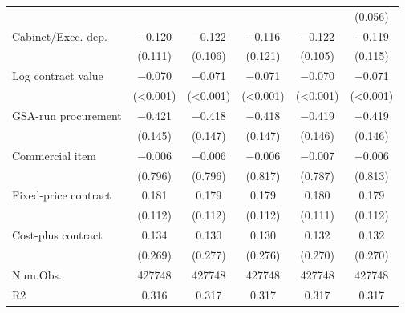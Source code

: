 \begin{tabular}[t]{lccccc}
 &  &  &  &  & (\num{0.056})\\
Cabinet/Exec. dep. & \num{-0.120} & \num{-0.122} & \num{-0.116} & \num{-0.122} & \num{-0.119}\\
 & (\num{0.111}) & (\num{0.106}) & (\num{0.121}) & (\num{0.105}) & (\num{0.115})\\
Log contract value & \num{-0.070} & \num{-0.071} & \num{-0.071} & \num{-0.070} & \num{-0.071}\\
 & (\num{<0.001}) & (\num{<0.001}) & (\num{<0.001}) & (\num{<0.001}) & (\num{<0.001})\\
GSA-run procurement & \num{-0.421} & \num{-0.418} & \num{-0.418} & \num{-0.419} & \num{-0.419}\\
 & (\num{0.145}) & (\num{0.147}) & (\num{0.147}) & (\num{0.146}) & (\num{0.146})\\
Commercial item & \num{-0.006} & \num{-0.006} & \num{-0.006} & \num{-0.007} & \num{-0.006}\\
 & (\num{0.796}) & (\num{0.796}) & (\num{0.817}) & (\num{0.787}) & (\num{0.813})\\
Fixed-price contract & \num{0.181} & \num{0.179} & \num{0.179} & \num{0.180} & \num{0.179}\\
 & (\num{0.112}) & (\num{0.112}) & (\num{0.112}) & (\num{0.111}) & (\num{0.112})\\
Cost-plus contract & \num{0.134} & \num{0.130} & \num{0.130} & \num{0.132} & \num{0.132}\\
 & (\num{0.269}) & (\num{0.277}) & (\num{0.276}) & (\num{0.270}) & (\num{0.270})\\
\midrule
Num.Obs. & \num{427748} & \num{427748} & \num{427748} & \num{427748} & \num{427748}\\
R2 & \num{0.316} & \num{0.317} & \num{0.317} & \num{0.317} & \num{0.317}\\
\bottomrule
\end{tabular}

